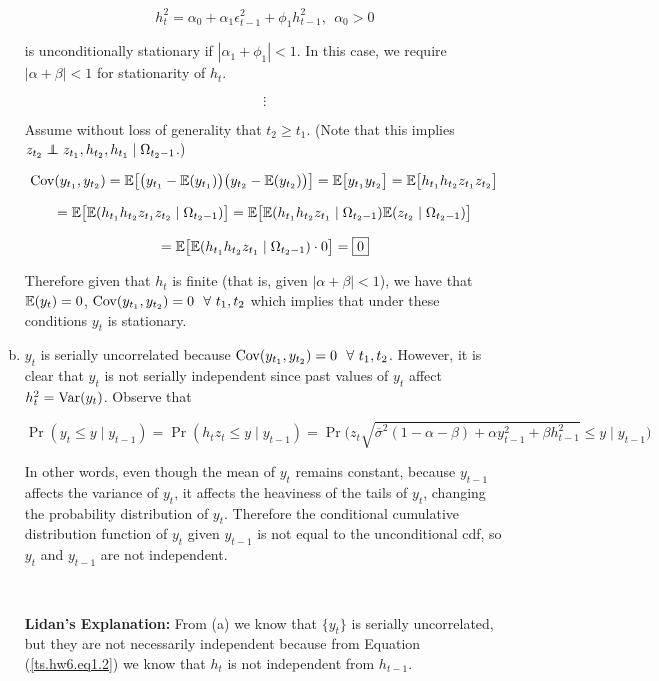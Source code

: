 \begin{enumerate}[(a)]
\[
h_t^2 = \alpha_0 + \alpha_1 \epsilon_{t-1}^2 + \phi_1 h_{t-1}^2, \ \ \alpha_0 > 0
\]

is unconditionally stationary if \(|\alpha_1 + \phi_1| < 1\). In this case, we require \(\boxed{|\alpha + \beta| < 1}\) for stationarity of \(h_t\).


\[
\vdots
\]

Assume without loss of generality that \(t_2 \geq t_1\). (Note that this implies \(z_{t_2} \indep z_{t_1}, h_{t_2}, h_{t_1} \mid \Omega_{t_2- 1}\).)

\[
\mathrm{Cov}(y_{t_1}, y_{t_2} ) = \mathbb{E}\big[ \big( y_{t_1} - \mathbb{E}(y_{t_1}) \big) \big( y_{t_2} - \mathbb{E}(y_{t_2}) \big) \big] = \mathbb{E}\big[y_{t_1} y_{t_2} \big] = \mathbb{E}\big[h_{t_1}h_{t_2} z_{t_1}z_{t_2} \big]
\]

\[
= \mathbb{E}\big[ \mathbb{E}(h_{t_1}h_{t_2} z_{t_1}z_{t_2} \mid \Omega_{t_2-1} ) \big] = \mathbb{E}\big[ \mathbb{E}(h_{t_1}h_{t_2} z_{t_1} \mid \Omega_{t_2-1} ) \mathbb{E}(z_{t_2} \mid \Omega_{t_2-1}) \big]
\]

\[
= \mathbb{E}\big[ \mathbb{E}(h_{t_1}h_{t_2} z_{t_1} \mid \Omega_{t_2-1} )\cdot 0 \big] = \boxed{0}
\]

Therefore given that \(h_t\) is finite (that is, given \(|\alpha + \beta| < 1\)), we have that \(\mathbb{E}(y_t) = 0\), \(\mathrm{Cov}(y_{t_1}, y_{t_2}) = 0\ \ \forall \ t_1, t_2\) which implies that under these conditions \(y_t\) is stationary.

\item 

\(y_t\) is serially uncorrelated because \(\mathrm{Cov}(y_{t_1}, y_{t_2} )= 0 \ \ \forall \ t_1, t_2\). However, it is clear that \(y_t\) is not serially independent since past values of \(y_t\) affect \(h_t^2 = \mathrm{Var}(y_t)\). Observe that

\[
\Pr(y_t \leq y \mid y_{t-1}) = \Pr(h_t z_t \leq y \mid y_{t-1}) = \Pr \bigg (z_t \sqrt{\overline{\sigma}^2(1 - \alpha - \beta) + \alpha y_{t-1}^2 + \beta h_{t-1}^2 } \leq y \mid y_{t-1} \bigg)
\]

In other words, even though the mean of \(y_t\) remains constant, because \(y_{t-1}\) affects the variance of \(y_t\), it affects the heaviness of the tails of \(y_t\), changing the probability distribution of \(y_t\). Therefore the conditional cumulative distribution function of \(y_t\) given \(y_{t-1}\) is not equal to the unconditional cdf, so \(y_t\) and \(y_{t-1}\) are not independent.

\

\textbf{Lidan's Explanation:} From (a) we know that \(\{y_t\}\) is serially uncorrelated, but they are not necessarily independent because from Equation (\ref{ts.hw6.eq1.2}) we know that \(h_t\) is not independent from \(h_{t-1}\).


\end{enumerate}
